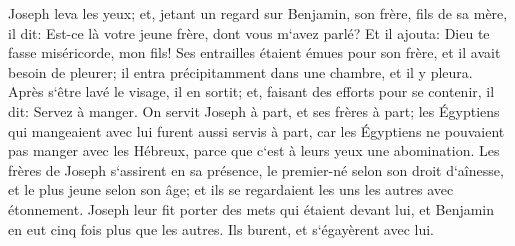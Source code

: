 \verse Joseph leva les yeux; et, jetant un regard sur Benjamin, son frère, fils de sa mère, il dit: Est-ce là votre jeune frère, dont vous m`avez parlé? Et il ajouta: Dieu te fasse miséricorde, mon fils! 
\verse Ses entrailles étaient émues pour son frère, et il avait besoin de pleurer; il entra précipitamment dans une chambre, et il y pleura. 
\verse Après s`être lavé le visage, il en sortit; et, faisant des efforts pour se contenir, il dit: Servez à manger. 
\verse On servit Joseph à part, et ses frères à part; les Égyptiens qui mangeaient avec lui furent aussi servis à part, car les Égyptiens ne pouvaient pas manger avec les Hébreux, parce que c`est à leurs yeux une abomination. 
\verse Les frères de Joseph s`assirent en sa présence, le premier-né selon son droit d`aînesse, et le plus jeune selon son âge; et ils se regardaient les uns les autres avec étonnement. 
\verse Joseph leur fit porter des mets qui étaient devant lui, et Benjamin en eut cinq fois plus que les autres. Ils burent, et s`égayèrent avec lui. 

